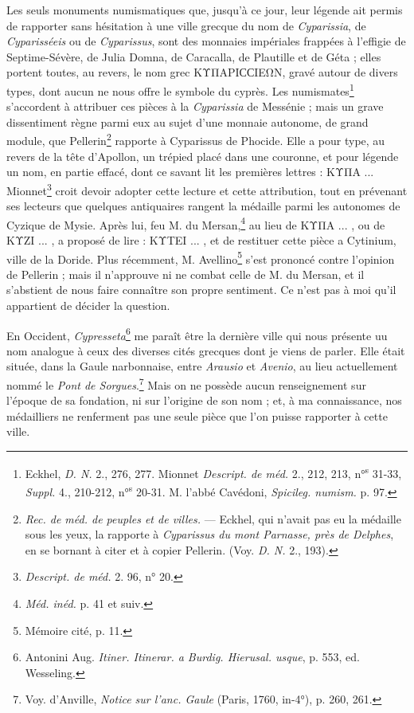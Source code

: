 \documentclass{article}
\begin{document}
Les seuls monuments numismatiques que, jusqu'à ce jour, leur légende ait permis de rapporter sans hésitation à une ville grecque du nom de \emph{Cyparissia}, de \emph{Cyparisséeis} ou de \emph{Cyparissus}, sont des monnaies impériales frappées à l'effigie de Septime-Sévère, de Julia Domna, de Caracalla, de Plautille et de Géta ; elles portent toutes, au revers, le nom grec \textgreek{ΚΥΠΑΡΙϹϹΙΕΩΝ}, gravé autour de divers types, dont aucun ne nous offre le symbole du cyprès. Les numismates\footnote{Eckhel, \emph{D. N.} 2., 276, 277. Mionnet \emph{Descript. de méd.} 2., 212, 213, n°\textsuperscript{s} 31-33, \emph{Suppl.} 4., 210-212, n°\textsuperscript{s} 20-31. M. l'abbé Cavédoni, \emph{Spicileg. numism.} p. 97.} s'accordent à attribuer ces pièces à la \emph{Cyparissia} de Messénie ; mais un grave dissentiment règne parmi eux au sujet d'une monnaie autonome, de grand module, que Pellerin\footnote{\emph{Rec. de méd. de peuples et de villes.} --- Eckhel, qui n'avait pas eu la médaille sous les yeux, la rapporte à \emph{Cyparissus du mont Parnasse, près de Delphes}, en se bornant à citer et à copier Pellerin. (Voy. \emph{D. N.} 2., 193).} rapporte à Cyparissus de Phocide. Elle a pour type, au revers de la tête d'Apollon, un trépied placé dans une couronne, et pour légende un nom, en partie effacé, dont ce savant lit les premières lettres : \textgreek{ΚΥΠΑ} ... Mionnet\footnote{\emph{Descript. de méd.} 2. 96, n° 20.} croit devoir adopter cette lecture et cette attribution, tout en prévenant ses lecteurs que quelques antiquaires rangent la médaille parmi les autonomes de Cyzique de Mysie. Après lui, feu M. du Mersan,\footnote{\emph{Méd. inéd.} p. 41 et suiv.} au lieu de \textgreek{ΚΥΠΑ} ... , ou de \textgreek{ΚΥΖΙ} ... , a proposé de lire : \textgreek{ΚΥΤΕΙ} ... , et de restituer cette pièce a Cytinium, ville de la Doride. Plus récemment, M. Avellino\footnote{Mémoire cité, p. 11.} s'est prononcé contre l'opinion de Pellerin ; mais il n'approuve ni ne combat celle de M. du Mersan, et il s'abstient de nous faire connaître son propre sentiment. Ce n'est pas à moi qu'il appartient de décider la question.

En Occident, \emph{Cypresseta}\footnote{Antonini Aug. \emph{Itiner. Itinerar. a Burdig. Hierusal. usque}, p. 553, ed. Wesseling.} me paraît être la dernière ville qui nous présente uu nom analogue à ceux des diverses cités grecques dont je viens de parler. Elle était située, dans la Gaule narbonnaise, entre \emph{Arausio} et \emph{Avenio}, au lieu actuellement nommé le \emph{Pont de Sorgues}.\footnote{Voy. d'Anville, \emph{Notice sur l'anc. Gaule} (Paris, 1760, in-4°), p. 260, 261.} Mais on ne possède aucun renseignement sur l'époque de sa fondation, ni sur l'origine de son nom ; et, à ma connaissance, nos médailliers ne renferment pas une seule pièce que l'on puisse rapporter à cette ville.
\end{document}
